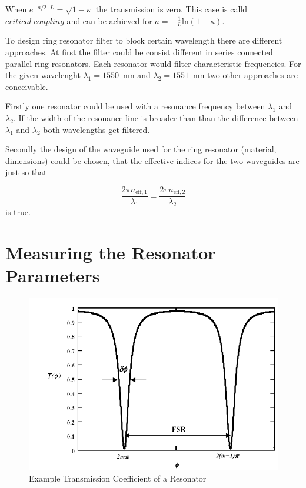 When $e^{-a/2\cdot L} = \sqrt{1-\kappa}$ the transmission is zero. This case is calld $critical~coupling$ and can be achieved for $a = - \frac{1}{L}\mathrm{ln}(1-\kappa)$.

To design ring resonator filter to block certain wavelength there are different approaches.
At first the filter could be consist different in series connected parallel ring resonators. Each resonator would filter characteristic frequencies.
For the given wavelenght $\lambda_1 = 1550$~nm and $\lambda_2 = 1551$~nm two other approaches are conceivable.

Firstly one resonator could be used with a resonance frequency between $\lambda_1$ and $\lambda_2$. If the width of the resonance line is broader than than the difference between $\lambda_1$ and $\lambda_2$ both wavelengths get filtered.

Secondly the design of the waveguide used for the ring resonator (material, dimensions) could be chosen, that the effective indices for the two waveguides are just so that 

\begin{equation}
\frac{2\pi n_{\mathrm{eff,1}}}{\lambda_1} = \frac{2\pi n_{\mathrm{eff,2}}}{\lambda_2}
\label{eq:}
\end{equation}
is true.


\section{Measuring the Resonator Parameters}

\begin{figure}[h]%
\centering
\includegraphics[width=.5\columnwidth]{Grafiken/S21.pdf}%
\caption{Example Transmission Coefficient of a Resonator}%
\label{fig:S21}%
\end{figure}

